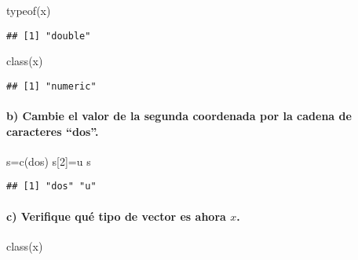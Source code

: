 \documentclass[
]{article}
\newenvironment{Shaded}{\begin{snugshade}}{\end{snugshade}}
\newcommand{\DecValTok}[1]{\textcolor[rgb]{0.00,0.00,0.81}{#1}}
\newcommand{\FunctionTok}[1]{\textcolor[rgb]{0.00,0.00,0.00}{#1}}
\newcommand{\NormalTok}[1]{#1}
\newcommand{\OtherTok}[1]{\textcolor[rgb]{0.56,0.35,0.01}{#1}}
\newcommand{\StringTok}[1]{\textcolor[rgb]{0.31,0.60,0.02}{#1}}
\begin{document}
\begin{Shaded}
\begin{Highlighting}[]
\FunctionTok{typeof}\NormalTok{(x)}
\end{Highlighting}
\end{Shaded}

\begin{verbatim}
## [1] "double"
\end{verbatim}

\begin{Shaded}
\begin{Highlighting}[]
\FunctionTok{class}\NormalTok{(x)}
\end{Highlighting}
\end{Shaded}

\begin{verbatim}
## [1] "numeric"
\end{verbatim}

\hypertarget{b-cambie-el-valor-de-la-segunda-coordenada-por-la-cadena-de-caracteres-dos.}{%
\paragraph{b) Cambie el valor de la segunda coordenada por la cadena de
caracteres
``dos''.}\label{b-cambie-el-valor-de-la-segunda-coordenada-por-la-cadena-de-caracteres-dos.}}

\begin{Shaded}
\begin{Highlighting}[]
\NormalTok{s}\OtherTok{=}\FunctionTok{c}\NormalTok{(}\StringTok{\textquotesingle{}dos\textquotesingle{}}\NormalTok{)}
\NormalTok{s[}\DecValTok{2}\NormalTok{]}\OtherTok{=}\StringTok{\textquotesingle{}u\textquotesingle{}}
\NormalTok{s}
\end{Highlighting}
\end{Shaded}

\begin{verbatim}
## [1] "dos" "u"
\end{verbatim}

\hypertarget{c-verifique-quuxe9-tipo-de-vector-es-ahora-x.}{%
\paragraph{\texorpdfstring{c) Verifique qué tipo de vector es ahora
\(x\).}{c) Verifique qué tipo de vector es ahora x.}}\label{c-verifique-quuxe9-tipo-de-vector-es-ahora-x.}}

\begin{Shaded}
\begin{Highlighting}[]
\FunctionTok{class}\NormalTok{(x)}
\end{Highlighting}
\end{Shaded}
\end{document}
